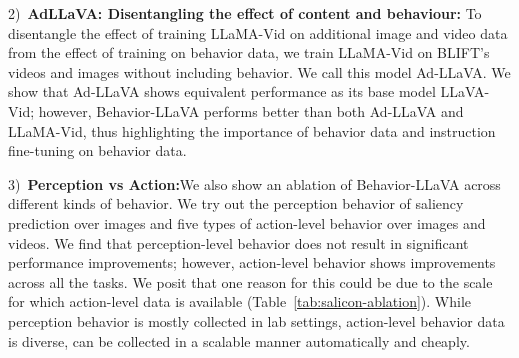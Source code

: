 2)~\textbf{AdLLaVA: Disentangling the effect of content and behaviour:} To disentangle the effect of training LLaMA-Vid on additional image and video data from the effect of training on behavior data, we train LLaMA-Vid on BLIFT's videos and images without including behavior. We call this model Ad-LLaVA. We show that Ad-LLaVA shows equivalent performance as its base model LLaVA-Vid; however, Behavior-LLaVA  performs better than both Ad-LLaVA and LLaMA-Vid, thus highlighting the importance of behavior data and instruction fine-tuning on behavior data.


3)~\textbf{Perception vs Action:}We also show an ablation of Behavior-LLaVA across different kinds of behavior. We try out the perception behavior of saliency prediction over images and five types of action-level behavior over images and videos. We find that perception-level behavior does not result in significant performance improvements; however, action-level behavior shows improvements across all the tasks. We posit that one reason for this could be due to the scale for which action-level data is available (Table~\ref{tab:salicon-ablation}). While perception behavior is mostly collected in lab settings, action-level behavior data is diverse, can be collected in a scalable manner automatically and cheaply.












